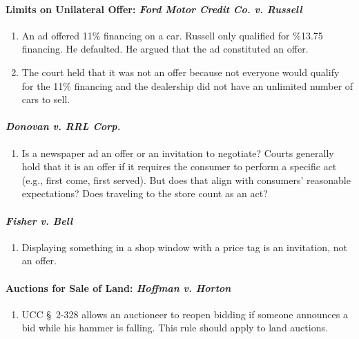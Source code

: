 \paragraph{Limits on Unilateral Offer: \emph{Ford Motor Credit Co. v. 
Russell}}

\begin{enumerate}
    \item An ad offered 11\% financing on a car. Russell only qualified for 
    \%13.75 financing. He defaulted. He argued that the ad constituted an 
    offer.
    \item The court held that it was not an offer because not everyone would 
    qualify for the 11\% financing and the dealership did not have an 
    unlimited number of cars to sell.
\end{enumerate}

\paragraph{\emph{Donovan v. RRL Corp.}}

\begin{enumerate}
    \item Is a newspaper ad an offer or an invitation to negotiate? Courts 
    generally hold that it is an offer if it requires the consumer to perform 
    a specific act (e.g., first come, first served). But does that align with 
    consumers' reasonable expectations? Does traveling to the store count as 
    an act?
\end{enumerate}

\paragraph{\emph{Fisher v. Bell}}

\begin{enumerate}
    \item Displaying something in a shop window with a price tag is an invitation, not an offer.
\end{enumerate}

\paragraph{Auctions for Sale of Land: \emph{Hoffman v. Horton}}

\begin{enumerate}
    \item UCC \S\ 2-328 allows an auctioneer to reopen bidding if someone 
    announces a bid while his hammer is falling. This rule should apply to 
    land auctions.
\end{enumerate}

